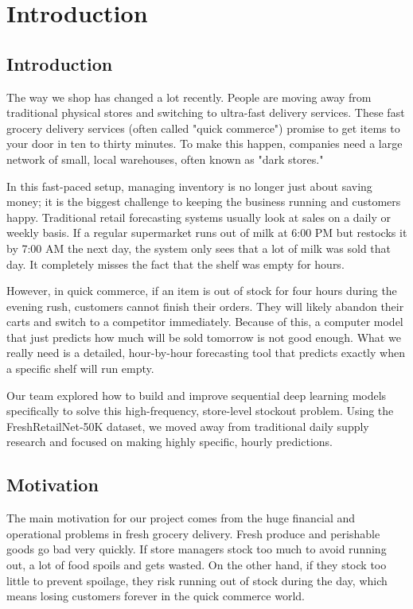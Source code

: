 \chapter{Introduction}
\label{chap:intro}

\section{Introduction}

The way we shop has changed a lot recently. People are moving away from traditional physical stores and switching to ultra-fast delivery services. These fast grocery delivery services (often called "quick commerce") promise to get items to your door in ten to thirty minutes. To make this happen, companies need a large network of small, local warehouses, often known as "dark stores."

In this fast-paced setup, managing inventory is no longer just about saving money; it is the biggest challenge to keeping the business running and customers happy. Traditional retail forecasting systems usually look at sales on a daily or weekly basis. If a regular supermarket runs out of milk at 6:00 PM but restocks it by 7:00 AM the next day, the system only sees that a lot of milk was sold that day. It completely misses the fact that the shelf was empty for hours.

However, in quick commerce, if an item is out of stock for four hours during the evening rush, customers cannot finish their orders. They will likely abandon their carts and switch to a competitor immediately. Because of this, a computer model that just predicts how much will be sold tomorrow is not good enough. What we really need is a detailed, hour-by-hour forecasting tool that predicts exactly when a specific shelf will run empty.

Our team explored how to build and improve sequential deep learning models specifically to solve this high-frequency, store-level stockout problem. Using the FreshRetailNet-50K dataset, we moved away from traditional daily supply research and focused on making highly specific, hourly predictions.

\section{Motivation}

The main motivation for our project comes from the huge financial and operational problems in fresh grocery delivery. Fresh produce and perishable goods go bad very quickly. If store managers stock too much to avoid running out, a lot of food spoils and gets wasted. On the other hand, if they stock too little to prevent spoilage, they risk running out of stock during the day, which means losing customers forever in the quick commerce world.

